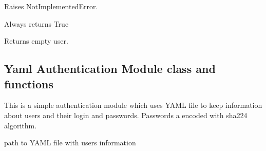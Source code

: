 \documentclass[letterpaper,10pt,english]{sphinxmanual}
\begin{document}
\begin{fulllineitems}
\begin{fulllineitems}
\label{sysmod:pyfrid.modules.system.auth.noauth.BaseNoAuthModule.user_exists}
Raises NotImplementedError.

\end{fulllineitems}


\begin{fulllineitems}
\label{sysmod:pyfrid.modules.system.auth.noauth.BaseNoAuthModule.validate_access}
Always returns True

\end{fulllineitems}


\begin{fulllineitems}
\label{sysmod:pyfrid.modules.system.auth.noauth.BaseNoAuthModule.validate_user}
Returns empty user.

\end{fulllineitems}


\end{fulllineitems}



\subsection{Yaml Authentication Module class and functions}
\label{sysmod:module-pyfrid.modules.system.auth.yamlauth}\label{sysmod:yaml-authentication-module-class-and-functions}

\begin{fulllineitems}
\label{sysmod:pyfrid.modules.system.auth.yamlauth.BaseYamlAuthModule}
This is a simple authentication module which uses YAML file to keep information about users and their login and passwords.
Passwords a encoded with sha224 algorithm.

\begin{fulllineitems}
\label{sysmod:pyfrid.modules.system.auth.yamlauth.BaseYamlAuthModule.dbpath}
path to YAML file with users information

\end{fulllineitems}


\end{fulllineitems}
\end{document}
